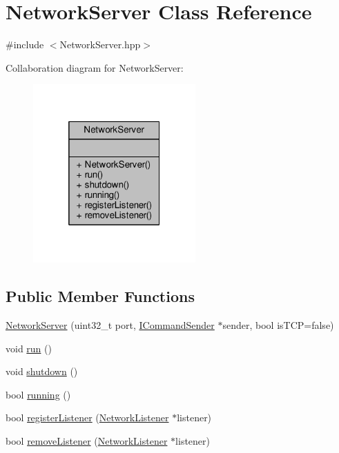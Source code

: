 \hypertarget{class_network_server}{\section{Network\-Server Class Reference}
\label{class_network_server}
}


{\ttfamily \#include $<$Network\-Server.\-hpp$>$}



Collaboration diagram for Network\-Server\-:
\nopagebreak
\begin{figure}[H]
\begin{center}
\leavevmode
\includegraphics[width=176pt]{class_network_server__coll__graph}
\end{center}
\end{figure}
\subsection*{Public Member Functions}
\begin{DoxyCompactItemize}
\item 
\hyperlink{class_network_server_a7305827935f68d67c018f0e7554598cf}{Network\-Server} (uint32\-\_\-t port, \hyperlink{class_i_command_sender}{I\-Command\-Sender} $\ast$sender, bool is\-T\-C\-P=false)
\item 
void \hyperlink{class_network_server_ae9a3ec5c90111aa30caa44dfe4e653fb}{run} ()
\item 
void \hyperlink{class_network_server_a9ccac6f1950c9e6e15052fce78d4dd94}{shutdown} ()
\item 
bool \hyperlink{class_network_server_a34695eaa70558f1c150bb9b6e1fa715a}{running} ()
\item 
bool \hyperlink{class_network_server_afea0a42a02bd350e15d1a437ef98a646}{register\-Listener} (\hyperlink{class_network_listener}{Network\-Listener} $\ast$listener)
\item 
bool \hyperlink{class_network_server_ab5a237f9f81ac6dc65d5d65941cab588}{remove\-Listener} (\hyperlink{class_network_listener}{Network\-Listener} $\ast$listener)
\end{DoxyCompactItemize}


